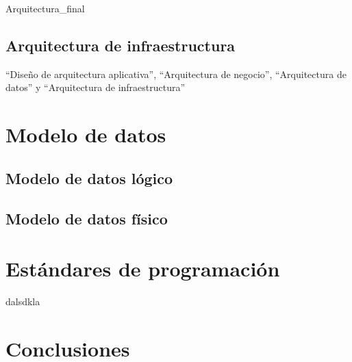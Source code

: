 \documentclass[a4paper,openright,12pt]{book}
\begin{document}
Arquitectura\_final %

\section{Arquitectura de infraestructura}

``Diseño de arquitectura aplicativa'', ``Arquitectura de negocio'',
``Arquitectura de datos'' y ``Arquitectura de infraestructura''

\chapter*{Modelo de datos}

\label{cap.modelo}

\section{Modelo de datos lógico}

\section{Modelo de datos físico}

\chapter*{Estándares de programación}
\label{cap.estandares}

dalsdkla %

\chapter*{Conclusiones}
\label{cap.conclusiones}
\end{document}

